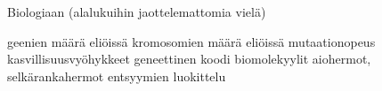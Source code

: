 Biologiaan (alalukuihin jaottelemattomia vielä)


geenien määrä eliöissä
kromosomien määrä eliöissä
mutaationopeus
kasvillisuusvyöhykkeet
geneettinen koodi
biomolekyylit
aiohermot, selkärankahermot
entsyymien luokittelu